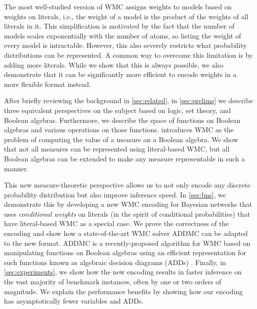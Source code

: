 \documentclass{article}
\begin{document}
The most well-studied version of WMC assigns weights to models based on
weights on literals, i.e., the weight of a model is the product of the weights
of all literals in it. This simplification is motivated by the fact that the
number of models scales exponentially with the number of atoms, so listing the
weight of every model is intractable. However, this also severely restricts what
probability distributions can be represented. A common way to overcome this
limitation is by adding more literals. While we show that this is always
possible, we also demonstrate that it can be significantly more efficient to
encode weights in a more flexible format instead.

After briefly reviewing the background in \cref{sec:related}, in
\cref{sec:prelims} we  describe three equivalent perspectives on the subject
based on logic, set theory, and Boolean algebras. Furthermore, we describe the
space of functions on Boolean algebras and various operations on those
functions.  introduces WMC as the problem of computing
the value of a measure on a Boolean algebra. We show that not all measures can
be represented using literal-based WMC, but all Boolean algebras can be extended
to make any measure representable in such a manner.

This new measure-theoretic perspective allows us to not only encode any
discrete probability distribution but also improve inference speed. In
\cref{sec:bns}, we demonstrate this by developing a new WMC encoding for
Bayesian networks that uses \emph{conditional weights} on literals (in the
spirit of conditional probabilities) that have literal-based WMC as a special
case. We prove the correctness of the encoding and show how a state-of-the-art
WMC solver ADDMC \cite{DBLP:conf/aaai/DudekPV20} can be adapted to the new
format. ADDMC is a recently-proposed algorithm for WMC based on manipulating
functions on Boolean algebras using an efficient representation for such
functions known as algebraic decision diagrams (ADDs)
\cite{DBLP:journals/fmsd/BaharFGHMPS97}. Finally, in \cref{sec:experiments}, we
show how the new encoding results in faster inference on the vast majority of
benchmark instances, often by one or two orders of magnitude. We explain the
performance benefits by showing how our encoding has asymptotically fewer
variables and ADDs.


\end{document}
